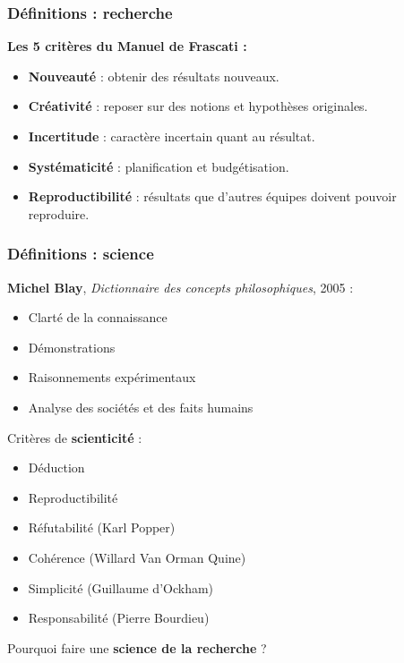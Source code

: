 \documentclass[xcolor=dvipsnames]{beamer}
\begin{document}
	\begin{frame}
		\frametitle{Définitions : recherche}
		\textbf{Les 5 critères du Manuel de Frascati :}
		\begin{itemize}
			\item \textbf{Nouveauté} : obtenir des résultats nouveaux.
			\item \textbf{Créativité} : reposer sur des notions et hypothèses originales.
			\item \textbf{Incertitude} : caractère incertain quant au résultat.
			\item \textbf{Systématicité} : planification et budgétisation.
			\item \textbf{Reproductibilité} : résultats que d'autres équipes doivent pouvoir reproduire.
		\end{itemize}
	\end{frame}
	\begin{frame}
		\frametitle{Définitions : science}
		\textbf{Michel Blay}, \textit{Dictionnaire des concepts philosophiques}, 2005 :
		\begin{multicols}{2}
			\begin{itemize}
				\small
				\item Clarté de la connaissance
				\item Démonstrations
				\item Raisonnements expérimentaux
				\item Analyse des sociétés et des faits humains
			\end{itemize}
			\normalsize
		\end{multicols}
		Critères de \textbf{scienticité} :
		\begin{multicols}{2}
			\small
			\begin{itemize}
				\item Déduction
				\item Reproductibilité
				\item Réfutabilité (Karl Popper)
				\item Cohérence (Willard Van Orman Quine)
				\item Simplicité (Guillaume d'Ockham)
				\item Responsabilité (Pierre Bourdieu)
			\end{itemize}
		\end{multicols}
		\normalsize
		\begin{center}
			Pourquoi faire une \textbf{science de la recherche} ?
		\end{center}
	\end{frame}
\end{document}
